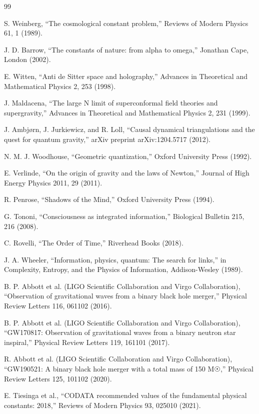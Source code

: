\documentclass[12pt,a4paper]{article}
\begin{document}

\begin{thebibliography}{99}

S. Weinberg, ``The cosmological constant problem,'' Reviews of Modern Physics 61, 1 (1989).

J. D. Barrow, ``The constants of nature: from alpha to omega,'' Jonathan Cape, London (2002).

E. Witten, ``Anti de Sitter space and holography,'' Advances in Theoretical and Mathematical Physics 2, 253 (1998).

J. Maldacena, ``The large N limit of superconformal field theories and supergravity,'' Advances in Theoretical and Mathematical Physics 2, 231 (1999).

J. Ambjørn, J. Jurkiewicz, and R. Loll, ``Causal dynamical triangulations and the quest for quantum gravity,'' arXiv preprint arXiv:1204.5717 (2012).

N. M. J. Woodhouse, ``Geometric quantization,'' Oxford University Press (1992).

E. Verlinde, ``On the origin of gravity and the laws of Newton,'' Journal of High Energy Physics 2011, 29 (2011).

R. Penrose, ``Shadows of the Mind,'' Oxford University Press (1994).

G. Tononi, ``Consciousness as integrated information,'' Biological Bulletin 215, 216 (2008).

C. Rovelli, ``The Order of Time,'' Riverhead Books (2018).

J. A. Wheeler, ``Information, physics, quantum: The search for links,'' in Complexity, Entropy, and the Physics of Information, Addison-Wesley (1989).

B. P. Abbott et al. (LIGO Scientific Collaboration and Virgo Collaboration), ``Observation of gravitational waves from a binary black hole merger,'' Physical Review Letters 116, 061102 (2016).

B. P. Abbott et al. (LIGO Scientific Collaboration and Virgo Collaboration), ``GW170817: Observation of gravitational waves from a binary neutron star inspiral,'' Physical Review Letters 119, 161101 (2017).

R. Abbott et al. (LIGO Scientific Collaboration and Virgo Collaboration), ``GW190521: A binary black hole merger with a total mass of 150 M☉,'' Physical Review Letters 125, 101102 (2020).

E. Tiesinga et al., ``CODATA recommended values of the fundamental physical constants: 2018,'' Reviews of Modern Physics 93, 025010 (2021).

\end{thebibliography}
\end{document}
